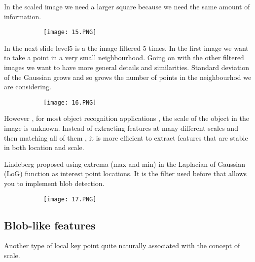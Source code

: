 \documentclass{article}
\begin{document}
In the scaled image we need a larger square because we need the same amount of information.

\begin{figure}[ht!]
  \centering
  \begin{subfigure}[b]{0.6\linewidth}
    \texttt{[image: 15.PNG]}
  \end{subfigure}
\end{figure}

In the next slide level5 is a the image filtered 5 times. In the first image we want to take a point in a very small neighbourhood. Going on with the other filtered images we want to have more general details and similarities. Standard deviation of the Gaussian grows and so grows the number of points in the neighbourhod  we are considering.

\begin{figure}[ht!]
  \centering
  \begin{subfigure}[b]{0.8\linewidth}
    \texttt{[image: 16.PNG]}
  \end{subfigure}
\end{figure}

\vspace{60mm}


However , for most object recognition applications , the scale of the object in the image is unknown. 
Instead of extracting features at many different scales and then matching all of them , it is more efficient to extract features that are stable in both location and scale.

Lindeberg proposed using extrema (max and min) in the Laplacian of Gaussian (LoG) function as interest point locations. It is the filter used before that allows you to implement blob detection.

\begin{figure}[ht!]
  \centering
  \begin{subfigure}[b]{0.6\linewidth}
    \texttt{[image: 17.PNG]}
  \end{subfigure}
\end{figure}


\vspace{70mm}

\subsection{Blob-like features}

Another type of local key point quite naturally associated with the concept of scale.
\end{document}
